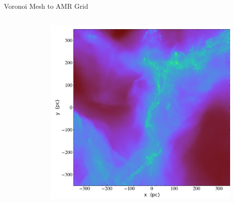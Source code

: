 \documentclass[aspectratio=169]{beamer}
\begin{document}
\begin{frame}{Voronoi Mesh to AMR Grid}
\begin{columns}
\begin{column}{0.3\textwidth}
\begin{figure}[h!]
                \label{fig:amr_example}
            \end{figure}
        \end{column}
        \begin{column}{0.3\textwidth}
                \begin{figure}[h!]
                \centering
                \includegraphics[width=\linewidth]{../images/VorAMR_hdf5_chk_0001_Projection_z_dens.png}
                \label{fig:amr_example}
            \end{figure}
        \end{column}
    \end{columns}
\end{frame} 
%
%
%
%
\end{document}
